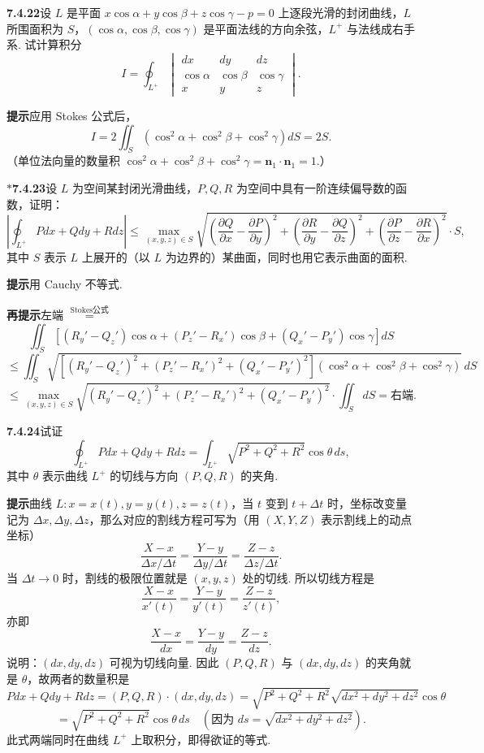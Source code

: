 \documentclass[UTF8, 12pt, fontset=fandol, oneside]{ctexart}
\providecommand{\xlongequal}[1]{\overset{#1}{=}}
\begin{document}
\noindent\textbf{7.4.22}\quad 设 $L$ 是平面 $x\cos\alpha+y\cos\beta+z\cos\gamma-p=0$ 上逐段光滑的封闭曲线，$L$ 所围面积为 $S$，$(\cos\alpha,\cos\beta,\cos\gamma)$ 是平面法线的方向余弦，$L^+$ 与法线成右手系. 试计算积分
\[
I=\oint_{L^+}
\begin{vmatrix}
dx & dy & dz\\
\cos\alpha & \cos\beta & \cos\gamma\\
x & y & z
\end{vmatrix}.
\]

\noindent\textbf{提示}\quad 应用 Stokes 公式后，
\[
I=2\iint_S(\cos^2\alpha+\cos^2\beta+\cos^2\gamma)dS=2S.
\]
（单位法向量的数量积 $\cos^2\alpha+\cos^2\beta+\cos^2\gamma=\mathbf n_1\cdot\mathbf n_1=1$.）

\noindent\textbf{$*$7.4.23}\quad 设 $L$ 为空间某封闭光滑曲线，$P,Q,R$ 为空间中具有一阶连续偏导数的函数，证明：
\[
\left|\oint_{L^+}Pdx+Qdy+Rdz\right|
\le\max_{(x,y,z)\in S}
\sqrt{\left(\frac{\partial Q}{\partial x}-\frac{\partial P}{\partial y}\right)^2
+\left(\frac{\partial R}{\partial y}-\frac{\partial Q}{\partial z}\right)^2
+\left(\frac{\partial P}{\partial z}-\frac{\partial R}{\partial x}\right)^2}\cdot S,
\]
其中 $S$ 表示 $L$ 上展开的（以 $L$ 为边界的）某曲面，同时也用它表示曲面的面积.

\noindent\textbf{提示}\quad 用 Cauchy 不等式.

\noindent\textbf{再提示}\quad 左端 $\xlongequal{\text{Stokes公式}}$
\[
\iint_S[(R_y'-Q_z')\cos\alpha+(P_z'-R_x')\cos\beta+(Q_x'-P_y')\cos\gamma]dS
\]
\[
\le\iint_S\sqrt{[(R_y'-Q_z')^2+(P_z'-R_x')^2+(Q_x'-P_y')^2](\cos^2\alpha+\cos^2\beta+\cos^2\gamma)}\,dS
\]
\[
\le\max_{(x,y,z)\in S}\sqrt{(R_y'-Q_z')^2+(P_z'-R_x')^2+(Q_x'-P_y')^2}\cdot\iint_SdS=\text{右端}.
\]

\noindent\textbf{7.4.24}\quad 试证
\[
\oint_{L^+}Pdx+Qdy+Rdz=\int_{L^+}\sqrt{P^2+Q^2+R^2}\cos\theta\,ds,
\]
其中 $\theta$ 表示曲线 $L^+$ 的切线与方向 $(P,Q,R)$ 的夹角.

\noindent\textbf{提示}\quad 曲线 $L:x=x(t),y=y(t),z=z(t)$，当 $t$ 变到 $t+\Delta t$ 时，坐标改变量记为 $\Delta x,\Delta y,\Delta z$，那么对应的割线方程可写为（用 $(X,Y,Z)$ 表示割线上的动点坐标）
\[
\frac{X-x}{\Delta x/\Delta t}=\frac{Y-y}{\Delta y/\Delta t}=\frac{Z-z}{\Delta z/\Delta t}.
\]
当 $\Delta t\to0$ 时，割线的极限位置就是 $(x,y,z)$ 处的切线. 所以切线方程是
\[
\frac{X-x}{x'(t)}=\frac{Y-y}{y'(t)}=\frac{Z-z}{z'(t)},
\]
亦即
\[
\frac{X-x}{dx}=\frac{Y-y}{dy}=\frac{Z-z}{dz}.
\]
说明：$(dx,dy,dz)$ 可视为切线向量. 因此 $(P,Q,R)$ 与 $(dx,dy,dz)$ 的夹角就是 $\theta$，故两者的数量积是
\[
Pdx+Qdy+Rdz=(P,Q,R)\cdot(dx,dy,dz)
=\sqrt{P^2+Q^2+R^2}\sqrt{dx^2+dy^2+dz^2}\cos\theta
\]
\[
=\sqrt{P^2+Q^2+R^2}\cos\theta\,ds
\quad(\text{因为 }ds=\sqrt{dx^2+dy^2+dz^2}).
\]
此式两端同时在曲线 $L^+$ 上取积分，即得欲证的等式.
\end{document}
